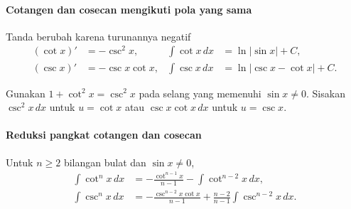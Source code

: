\documentclass{../../kalkulus-ppt}
\begin{document}
\begin{frame}{\insertsection}
    \framesubtitle{Cotangen dan cosecan mengikuti pola yang sama}
    \begin{block}{Tanda berubah karena turunannya negatif}
        \[
            \begin{aligned}
                (\cot x)'&=-\csc^2x,&
                \int\cot x\,dx&=\ln|\sin x|+C,\\
                (\csc x)'&=-\csc x\cot x,&
                \int\csc x\,dx&=\ln|\csc x-\cot x|+C.
            \end{aligned}
        \]
    \end{block}
    Gunakan $1+\cot^2x=\csc^2x$ pada selang yang memenuhi $\sin x\ne0$.
    Sisakan $\csc^2x\,dx$ untuk $u=\cot x$ atau $\csc x\cot x\,dx$
    untuk $u=\csc x$.
\end{frame}

\begin{frame}{\insertsection}
    \framesubtitle{Reduksi pangkat cotangen dan cosecan}
    \begin{teorema}
        Untuk $n\ge2$ bilangan bulat dan $\sin x\ne0$,
        \[
            \begin{aligned}
                \int\cot^n x\,dx
                    &=-\frac{\cot^{n-1}x}{n-1}-\int\cot^{n-2}x\,dx,\\
                \int\csc^n x\,dx
                    &=-\frac{\csc^{n-2}x\cot x}{n-1}
                      +\frac{n-2}{n-1}\int\csc^{n-2}x\,dx.
            \end{aligned}
        \]
    \end{teorema}
\end{frame}
\end{document}

